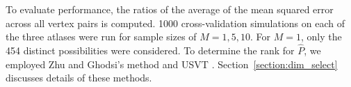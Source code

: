 \documentclass[journal,twoside,web]{ieeecolor}
\newcommand{\Ex}{\mathbb{E}}
\begin{document}
To evaluate performance, the ratios of the average of the mean squared error across all vertex pairs is computed.
1000 cross-validation simulations on each of the three atlases were run for sample sizes of $M=1, 5, 10$. For $M=1$, only the 454 distinct possibilities were considered.
To determine the rank for $\hat{P}$, we employed Zhu and Ghodsi's method \cite{zhu2006automatic} and USVT \cite{chatterjee2015matrix}.
Section~\ref{section:dim_select} discusses details of these methods.
\end{document}
